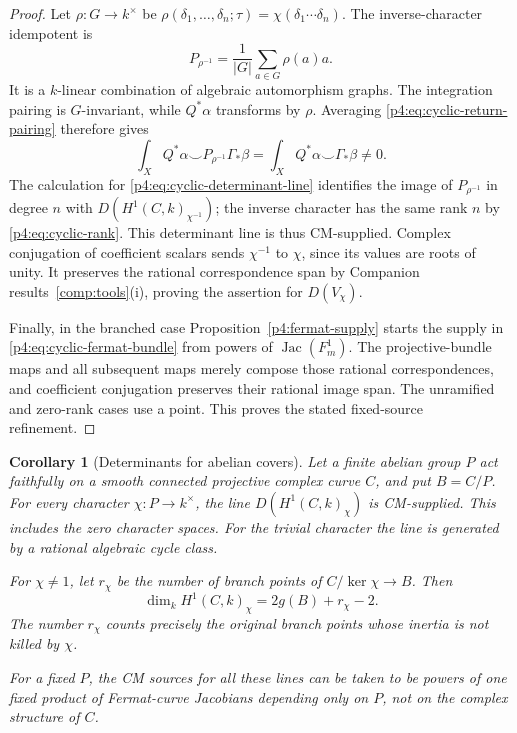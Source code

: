 \documentclass[11pt]{article}
\theoremstyle{plain}
\newtheorem{corollary}[theorem]{Corollary}
\theoremstyle{definition}
\theoremstyle{remark}
\numberwithin{equation}{section}
\begin{document}
\begin{proof}
Let $\rho:G\to k^\times$ be
$\rho(\delta_1,\ldots,\delta_n;\tau)
=\chi(\delta_1\cdots\delta_n)$.  The inverse-character
idempotent is
\[
 P_{\rho^{-1}}=\frac1{|G|}\sum_{a\in G}\rho(a)a.
\]
It is a $k$-linear combination of algebraic automorphism
graphs.  The integration pairing is $G$-invariant, while
$Q^*\alpha$ transforms by $\rho$.  Averaging
\eqref{p4:eq:cyclic-return-pairing} therefore gives
\[
 \int_X Q^*\alpha\smile P_{\rho^{-1}}\Gamma_*\beta
 =\int_X Q^*\alpha\smile\Gamma_*\beta\ne0.
\]
The calculation for \eqref{p4:eq:cyclic-determinant-line}
identifies the image of $P_{\rho^{-1}}$ in degree $n$ with
$D(H^1(C,k)_{\chi^{-1}})$; the inverse character has the same
rank $n$ by \eqref{p4:eq:cyclic-rank}.  This determinant line
is thus CM-supplied.  Complex conjugation of coefficient
scalars sends $\chi^{-1}$ to $\chi$, since its values are
roots of unity.  It preserves the rational correspondence
span by Companion results~\ref{comp:tools}\textup{(i)}, proving the assertion
for $D(V_\chi)$.

Finally, in the branched case
Proposition~\ref{p4:fermat-supply} starts the supply in
\eqref{p4:eq:cyclic-fermat-bundle} from powers of
$\operatorname{Jac}(F_m^1)$.  The projective-bundle maps
and all subsequent maps merely compose those rational
correspondences, and coefficient conjugation preserves their
rational image span.  The unramified and zero-rank cases
use a point.  This proves the stated fixed-source refinement.
\end{proof}

\begin{corollary}[Determinants for abelian covers]
\label{p4:abelian-determinants}
Let a finite abelian group $P$ act faithfully on a smooth connected
projective complex curve $C$, and put $B=C/P$.  For every
character $\chi:P\to k^\times$, the line
$D(H^1(C,k)_\chi)$ is CM-supplied.  This includes the zero
character spaces.  For the trivial character the line is
generated by a rational algebraic cycle class.

For $\chi\ne1$, let $r_\chi$ be the number of branch points of
$C/\ker\chi\to B$.  Then
\[
 \dim_k H^1(C,k)_\chi=2g(B)+r_\chi-2.
\]
The number $r_\chi$ counts precisely the original branch points
whose inertia is not killed by $\chi$.

For a fixed $P$, the CM sources for all these lines can be taken
to be powers of one fixed product of Fermat-curve Jacobians
depending only on $P$, not on the complex structure of $C$.
\end{corollary}
\end{document}

